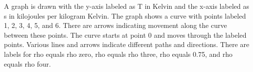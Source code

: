 A graph is drawn with the y-axis labeled as T in Kelvin and the x-axis labeled as s in kilojoules per kilogram Kelvin. The graph shows a curve with points labeled 1, 2, 3, 4, 5, and 6. There are arrows indicating movement along the curve between these points. The curve starts at point 0 and moves through the labeled points. Various lines and arrows indicate different paths and directions. There are labels for rho equals rho zero, rho equals rho three, rho equals 0.75, and rho equals rho four.